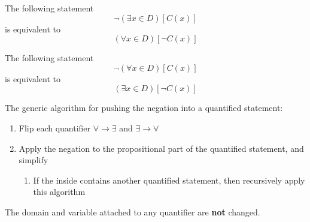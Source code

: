 \documentclass[main.tex]{subfiles}
\begin{document}
\begin{example}
	The following statement \[\lnot(\exists x \in D)[C(x)]\] is equivalent to \[(\forall x \in D)[\lnot C(x)]\]
\end{example}

\begin{example}
	The following statement \[\lnot(\forall x \in D)[C(x)]\] is equivalent to \[(\exists x \in D)[\lnot C(x)]\]
\end{example}

The generic algorithm for pushing the negation into a quantified statement:

\begin{enumerate}
	\item Flip each quantifier \(\forall \rightarrow \exists\) and \(\exists \rightarrow \forall\)
	\item Apply the negation to the propositional part of the quantified statement, and simplify
	\begin{enumerate}
		\item If the inside contains another quantified statement, then recursively apply this algorithm
	\end{enumerate}
\end{enumerate}

\begin{rem}
	The domain and variable attached to any quantifier are \textbf{not} changed.
\end{rem}

\end{document}
